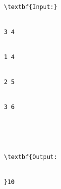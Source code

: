 \begin{verbatim}
\textbf{Input:}


3 4


1 4


2 5


3 6





\textbf{Output:


}10


\end{verbatim}